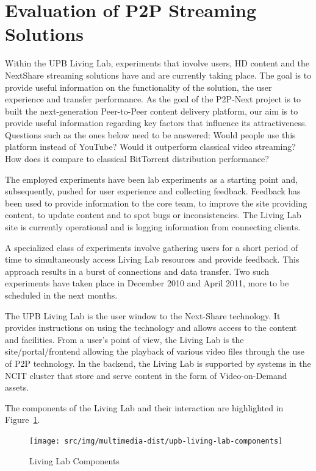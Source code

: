 \section{Evaluation of P2P Streaming Solutions}
\label{sec:multimedia-dist:evaluation}

Within the UPB Living Lab, experiments that involve users, HD content and the
NextShare streaming solutions have and are currently taking place. The goal is
to provide useful information on the functionality of the solution, the user
experience and transfer performance. As the goal of the P2P-Next project
is to built the next-generation Peer-to-Peer content delivery platform, our
aim is to provide useful information regarding key factors that influence its
attractiveness. Questions such as the ones below need to be answered: Would people use this platform instead of
YouTube? Would it outperform classical video streaming? How does it compare to
classical BitTorrent distribution performance?

The employed experiments have been lab experiments as a starting point and,
subsequently, pushed for user experience and collecting feedback. Feedback has
been used to provide information to the core team, to improve the site
providing content, to update content and to spot bugs or inconsistencies.
The Living Lab site is currently operational and is logging information from
connecting clients.

A specialized class of experiments involve gathering users for a short
period of time to simultaneously access Living Lab resources and provide
feedback. This approach results in a burst of connections and data transfer. Two such
experiments have taken place in December 2010 and April 2011, more to be
scheduled in the next months.

The UPB Living Lab is the user window to the Next-Share technology. It
provides instructions on using the technology and allows access to the content
and facilities. From a user's point of view,
the Living Lab is the site/portal/frontend allowing the playback of various video
files through the use of P2P technology. In the backend, the Living Lab is
supported by systems in the NCIT cluster that store and serve content in the
form of Video-on-Demand assets.

The components of the Living Lab and their interaction are highlighted in
Figure~\ref{fig:multimedia-dist:upb-living-lab-components}.

\begin{figure}
  \centering
  \texttt{[image: src/img/multimedia-dist/upb-living-lab-components]}
  \caption{Living Lab Components}
  \label{fig:multimedia-dist:upb-living-lab-components}
\end{figure}

